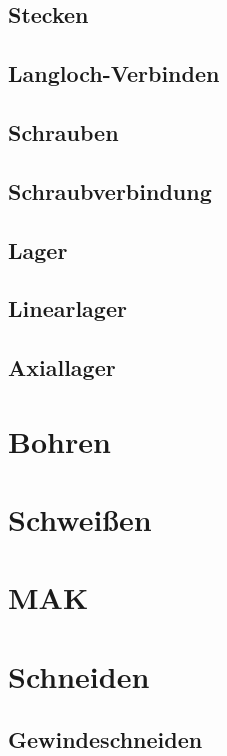 \documentclass[
	a4paper,
	smallheadings,
	german,
	]
	{scrreprt}
\begin{document}
	\subsection{Stecken}
	\subsection{Langloch-Verbinden}
	\subsection{Schrauben}
		\subsection{Schraubverbindung}
	\subsection{Lager}
		\subsection{Linearlager}
		\subsection{Axiallager}
\section{Bohren}
\section{Schweißen}
	\section{MAK}
\section{Schneiden}
\subsection{Gewindeschneiden}


\printbibliography
\end{document}
